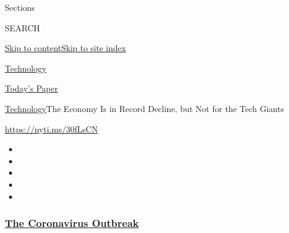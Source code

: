 Sections

SEARCH

\protect\hyperlink{site-content}{Skip to
content}\protect\hyperlink{site-index}{Skip to site index}

\href{https://www.nytimes3xbfgragh.onion/section/technology}{Technology}

\href{https://myaccount.nytimes3xbfgragh.onion/auth/login?response_type=cookie\&client_id=vi}{}

\href{https://www.nytimes3xbfgragh.onion/section/todayspaper}{Today's
Paper}

\href{/section/technology}{Technology}\textbar{}The Economy Is in Record
Decline, but Not for the Tech Giants

\url{https://nyti.ms/30fLsCN}

\begin{itemize}
\item
\item
\item
\item
\item
\end{itemize}

\hypertarget{the-coronavirus-outbreak}{%
\subsubsection{\texorpdfstring{\href{https://www.nytimes3xbfgragh.onion/news-event/coronavirus?name=styln-coronavirus-markets\&region=TOP_BANNER\&variant=undefined\&block=storyline_menu_recirc\&action=click\&pgtype=Article\&impression_id=b82c7280-e39e-11ea-bdf8-a17ccf54bfdb}{The
Coronavirus
Outbreak}}{The Coronavirus Outbreak}}\label{the-coronavirus-outbreak}}

